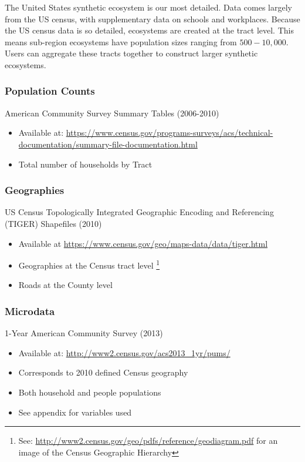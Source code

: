 \documentclass{article}
\begin{document}
		The United States synthetic ecosystem is our most detailed. Data comes largely from the US census, with supplementary data on schools and workplaces. Because the US census data is so detailed, ecosystems are created at the tract level. This means sub-region ecosystems have population sizes ranging from $500-10,000$. Users can aggregate these tracts together to construct larger synthetic ecosystems. 

		\subsubsection{Population Counts}
		American Community Survey Summary Tables (2006-2010) 
		\begin{itemize}
			\item Available at: \url{https://www.census.gov/programs-surveys/acs/technical-documentation/summary-file-documentation.html}
			\item Total number of households by Tract 
		\end{itemize}

		\subsubsection{Geographies}
		US Census Topologically Integrated Geographic Encoding and Referencing (TIGER) Shapefiles (2010)
		\begin{itemize}
			\item Available at \url{https://www.census.gov/geo/maps-data/data/tiger.html}
			\item Geographies at the Census tract level \footnote{See: \url{http://www2.census.gov/geo/pdfs/reference/geodiagram.pdf} for an image of the Census Geographic Hierarchy}
			\item Roads at the County level
		\end{itemize}

		\subsubsection{Microdata}
		1-Year American Community Survey (2013)
		\begin{itemize}
			\item Available at: \url{http://www2.census.gov/acs2013_1yr/pums/}
			\item Corresponds to 2010 defined Census geography
			\item Both household and people populations
			\item See appendix for variables used 
		\end{itemize}
\end{document}
